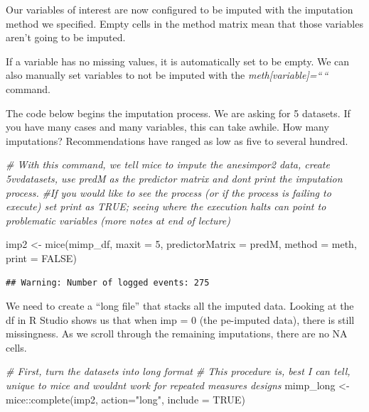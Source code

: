 \documentclass[
  11pt,
]{book}
\newenvironment{Shaded}{\begin{snugshade}}{\end{snugshade}}
\newcommand{\AttributeTok}[1]{\textcolor[rgb]{0.77,0.63,0.00}{#1}}
\newcommand{\CommentTok}[1]{\textcolor[rgb]{0.56,0.35,0.01}{\textit{#1}}}
\newcommand{\ConstantTok}[1]{\textcolor[rgb]{0.00,0.00,0.00}{#1}}
\newcommand{\DecValTok}[1]{\textcolor[rgb]{0.00,0.00,0.81}{#1}}
\newcommand{\FunctionTok}[1]{\textcolor[rgb]{0.00,0.00,0.00}{#1}}
\newcommand{\NormalTok}[1]{#1}
\newcommand{\OtherTok}[1]{\textcolor[rgb]{0.56,0.35,0.01}{#1}}
\newcommand{\SpecialCharTok}[1]{\textcolor[rgb]{0.00,0.00,0.00}{#1}}
\newcommand{\StringTok}[1]{\textcolor[rgb]{0.31,0.60,0.02}{#1}}
\begin{document}
Our variables of interest are now configured to be imputed with the imputation method we specified. Empty cells in the method matrix mean that those variables aren't going to be imputed.

If a variable has no missing values, it is automatically set to be empty. We can also manually set variables to not be imputed with the \emph{meth{[}variable{]}=``\,``} command.

The code below begins the imputation process. We are asking for 5 datasets. If you have many cases and many variables, this can take awhile. How many imputations? Recommendations have ranged as low as five to several hundred.

\begin{Shaded}
\begin{Highlighting}[]
\CommentTok{\# With this command, we tell mice to impute the anesimpor2 data, create 5vvdatasets, use predM as the predictor matrix and don\textquotesingle{}t print the imputation process. }
\CommentTok{\#If you would like to see the process (or if the process is failing to execute) set print as TRUE; seeing where the execution halts can point to problematic variables (more notes at end of lecture)}

\NormalTok{imp2 }\OtherTok{\textless{}{-}} \FunctionTok{mice}\NormalTok{(mimp\_df, }\AttributeTok{maxit =} \DecValTok{5}\NormalTok{, }
             \AttributeTok{predictorMatrix =}\NormalTok{ predM, }
             \AttributeTok{method =}\NormalTok{ meth, }\AttributeTok{print =}  \ConstantTok{FALSE}\NormalTok{)}
\end{Highlighting}
\end{Shaded}

\begin{verbatim}
## Warning: Number of logged events: 275
\end{verbatim}

We need to create a ``long file'' that stacks all the imputed data. Looking at the df in R Studio shows us that when imp = 0 (the pe-imputed data), there is still missingness. As we scroll through the remaining imputations, there are no NA cells.

\begin{Shaded}
\begin{Highlighting}[]
\CommentTok{\# First, turn the datasets into long format}
\CommentTok{\# This procedure is, best I can tell, unique to mice and wouldn\textquotesingle{}t work for repeated measures designs}
\NormalTok{mimp\_long }\OtherTok{\textless{}{-}}\NormalTok{ mice}\SpecialCharTok{::}\FunctionTok{complete}\NormalTok{(imp2, }\AttributeTok{action=}\StringTok{"long"}\NormalTok{, }\AttributeTok{include =} \ConstantTok{TRUE}\NormalTok{)}
\end{Highlighting}
\end{Shaded}
\end{document}
